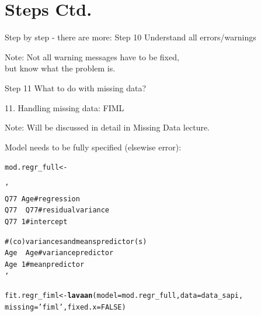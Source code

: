 \documentclass[10pt]{beamer}\usepackage[]{graphicx}\usepackage[]{xcolor}
\makeatletter
\newcommand{\hlnum}[1]{\textcolor[rgb]{0.686,0.059,0.569}{#1}}%
\newcommand{\hlstr}[1]{\textcolor[rgb]{0.192,0.494,0.8}{#1}}%
\newcommand{\hlstd}[1]{\textcolor[rgb]{0.345,0.345,0.345}{#1}}%
\newcommand{\hlkwb}[1]{\textcolor[rgb]{0.69,0.353,0.396}{#1}}%
\newcommand{\hlkwc}[1]{\textcolor[rgb]{0.333,0.667,0.333}{#1}}%
\newcommand{\hlkwd}[1]{\textcolor[rgb]{0.737,0.353,0.396}{\textbf{#1}}}%
\newenvironment{kframe}{%
 \def\at@end@of@kframe{}%
 \ifinner\ifhmode%
  \def\at@end@of@kframe{\end{minipage}}%
  \begin{minipage}{\columnwidth}%
 \fi\fi%
 \def\FrameCommand##1{\hskip\@totalleftmargin \hskip-\fboxsep
 \colorbox{shadecolor}{##1}\hskip-\fboxsep
     \hskip-\linewidth \hskip-\@totalleftmargin \hskip\columnwidth}%
 \MakeFramed {\advance\hsize-\width
   \@totalleftmargin\z@ \linewidth\hsize
   \@setminipage}}%
 {\par\unskip\endMakeFramed%
 \at@end@of@kframe}
\newenvironment{knitrout}{}{} %
\makeatother
\begin{document}
\section{Steps Ctd.}
%
\begin{frame}{Step by step - there are more: Step 10}
\Large{Understand all errors/warnings}

\vspace{5mm}

\normalsize{Note: Not all warning messages have to be fixed, \\ 
but know what the problem is.}
\end{frame}
%
\begin{frame}{Step 11}
\Large What to do with missing data?
\end{frame}
%
\begin{frame}[fragile]{11. Handling missing data: FIML}

Note: Will be discussed in detail in Missing Data lecture.

\vspace{5mm}

Model needs to be fully specified (elsewise error):

\begin{knitrout}
\color{fgcolor}\begin{kframe}
\begin{alltt}
\hlstd{mod.regr_full} \hlkwb{<-} \hlstr{'
  Q77 ~  Age # regression
  Q77 ~~ Q77 # residual variance
  Q77 ~  1   # intercept
  
  # (co)variances and means predictor(s)
  Age ~~ Age # variance predictor
  Age ~ 1    # mean predictor
'}
\hlstd{fit.regr_fiml} \hlkwb{<-} \hlkwd{lavaan}\hlstd{(}\hlkwc{model} \hlstd{= mod.regr_full,} \hlkwc{data} \hlstd{= data_sapi,}
                       \hlkwc{missing}\hlstd{=}\hlstr{'fiml'}\hlstd{,} \hlkwc{fixed.x}\hlstd{=}\hlnum{FALSE}\hlstd{)}
\end{alltt}


{\ttfamily\noindent\color{warningcolor}{\#\# Warning in lav\_data\_full(data = data, group = group, cluster = cluster, : lavaan WARNING: some cases are empty and will be ignored:\\\#\# \ \ 453 535}}\end{kframe}
\end{knitrout}
\end{frame}
\end{document}
